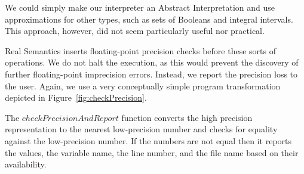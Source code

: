 We could simply make our interpreter an Abstract Interpretation and use
approximations for other types, such as sets of Booleans and integral
intervals. This approach, however, did not seem particularly useful nor practical.

Real Semantics inserts floating-point precision checks before these sorts of operations. We do not halt the execution, as this would prevent the discovery of further floating-point imprecision errors. Instead, we report the precision loss to the user. Again, we use a very conceptually simple program transformation depicted in Figure~\ref{fig:checkPrecision}.

The $checkPrecisionAndReport$ function converts the high precision representation to the nearest low-precision number and checks for equality against the low-precision number. If the numbers are not equal then it reports the values, the variable name, the line number, and the file name based on their availability.
